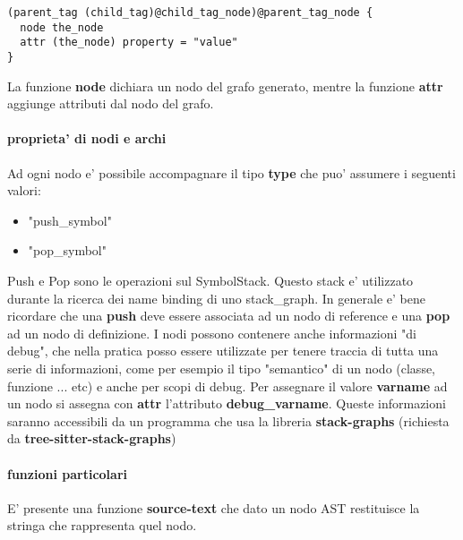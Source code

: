 \begin{verbatim}
(parent_tag (child_tag)@child_tag_node)@parent_tag_node {
  node the_node
  attr (the_node) property = "value"
}
\end{verbatim}

La funzione \textbf{node} dichiara un nodo del grafo generato, mentre la funzione \textbf{attr} aggiunge attributi dal nodo del grafo.

\paragraph{proprieta' di nodi e archi}

Ad ogni nodo e' possibile accompagnare il tipo \textbf{type} che puo' assumere i seguenti valori:

\begin{itemize}
  \item "push\_symbol"
  \item "pop\_symbol"
\end{itemize}

Push e Pop sono le operazioni sul SymbolStack. Questo stack e' utilizzato durante la ricerca dei name binding di uno stack\_graph. In generale e' bene ricordare che una \textbf{push} deve essere associata ad un nodo di reference e una \textbf{pop} ad un nodo di definizione.
I nodi possono contenere anche informazioni "di debug", che nella pratica posso essere utilizzate per tenere traccia di tutta una serie di informazioni, come per esempio il tipo "semantico" di un nodo (classe, funzione ... etc) e anche per scopi di debug. Per assegnare il valore \textbf{varname} ad un nodo si assegna con \textbf{attr} l'attributo \textbf{debug\_varname}. Queste informazioni saranno accessibili da un programma che usa la libreria \textbf{stack-graphs} (richiesta da \textbf{tree-sitter-stack-graphs})

\paragraph{funzioni particolari}

E' presente una funzione \textbf{source-text} che dato un nodo AST restituisce la stringa che rappresenta quel nodo.
